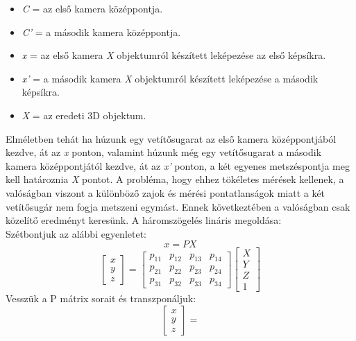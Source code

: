 \documentclass[12pt]{report}
\begin{document}
\begin{enumerate}
                    \begin{itemize}
                        \item \textit{C} = az első kamera középpontja.
                        \item \textit{C'} = a második kamera középpontja.
                        \item \textit{x} = az első kamera \textit{X} objektumról készített leképezése az első képsíkra.
                        \item \textit{x'} = a második kamera \textit{X} objektumról készített leképezése a második képsíkra.
                        \item \textit{X} = az eredeti 3D objektum.
                    \end{itemize}
                    Elméletben tehát ha húzunk egy vetítősugarat az első kamera középpontjából kezdve, át az \textit{x} ponton, valamint húzunk még egy vetítősugarat a második kamera középpontjától kezdve, át az \textit{x'} ponton, a két egyenes metszéspontja meg kell határoznia \textit{X} pontot. A probléma, hogy ehhez tökéletes mérések kellenek, a valóságban viszont a különböző zajok és mérési pontatlanságok miatt  a két vetítősugár nem fogja metszeni egymást. Ennek következtében a valóságban csak közelítő eredményt keresünk. A háromszögelés lináris megoldása: \\
                    Szétbontjuk az alábbi egyenletet:\\
                    \[x = PX\]
                    \[\begin{bmatrix}x\\y\\z\end{bmatrix} = 
                        \begin{bmatrix}
                        p_{11} & p_{12} & p_{13} & p_{14} \\
                        p_{21} & p_{22} & p_{23} & p_{24} \\
                        p_{31} & p_{32} & p_{33} & p_{34}
                        \end{bmatrix}
                        \begin{bmatrix}X\\Y\\Z\\1\end{bmatrix}\]
                        Vesszük a P mátrix sorait és transzponáljuk:
                        \[\begin{bmatrix}x\\y\\z\end{bmatrix} = 
\]
\end{enumerate}
\end{document}
